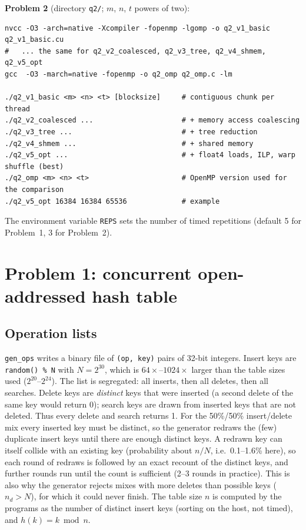 \documentclass[10pt,a4paper]{article}
\begin{document}
\textbf{Problem 2} (directory \texttt{q2/}; $m$, $n$, $t$ powers of two):
{\footnotesize\begin{verbatim}
nvcc -O3 -arch=native -Xcompiler -fopenmp -lgomp -o q2_v1_basic q2_v1_basic.cu
#   ... the same for q2_v2_coalesced, q2_v3_tree, q2_v4_shmem, q2_v5_opt
gcc  -O3 -march=native -fopenmp -o q2_omp q2_omp.c -lm

./q2_v1_basic <m> <n> <t> [blocksize]     # contiguous chunk per thread
./q2_v2_coalesced ...                     # + memory access coalescing
./q2_v3_tree ...                          # + tree reduction
./q2_v4_shmem ...                         # + shared memory
./q2_v5_opt ...                           # + float4 loads, ILP, warp shuffle (best)
./q2_omp <m> <n> <t>                      # OpenMP version used for the comparison
./q2_v5_opt 16384 16384 65536             # example
\end{verbatim}}
The environment variable \texttt{REPS} sets the number of timed repetitions
(default 5 for Problem~1, 3 for Problem~2).

\section{Problem 1: concurrent open-addressed hash table}

\subsection{Operation lists}
\texttt{gen\_ops} writes a binary file of \texttt{(op, key)} pairs of 32-bit
integers. Insert keys are \texttt{random() \% N} with $N=2^{30}$, which is
$64\times$--$1024\times$ larger than the table sizes used ($2^{20}$--$2^{24}$).
The list is segregated: all inserts, then all deletes, then all searches.
Delete keys are \emph{distinct} keys that were inserted (a second delete of
the same key would return 0); search keys are drawn from inserted keys that
are not deleted. Thus every delete and search returns 1. For the
50\%/50\% insert/delete mix every inserted key must be distinct, so the
generator redraws the (few) duplicate insert keys until there are enough
distinct keys. A redrawn key can itself collide with an existing key (probability
about $n/N$, i.e.\ 0.1--1.6\% here), so each round of redraws is followed by an
exact recount of the distinct keys, and further rounds run until the count is
sufficient (2--3 rounds in practice). This is also why the generator rejects mixes
with more deletes than possible keys ($n_d > N$), for which it could never finish.
The table size $n$ is computed by the programs as the number
of distinct insert keys (sorting on the host, not timed), and $h(k)=k \bmod n$.
\end{document}
